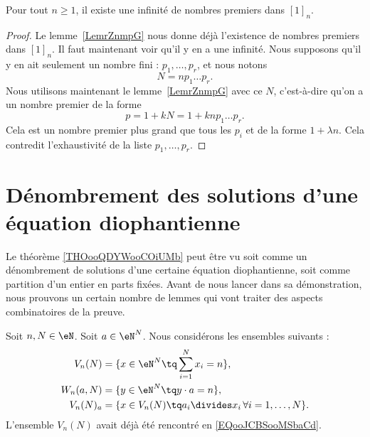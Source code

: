 \begin{theorem}    \label{ThoxwTjcl}
    Pour tout \( n\geq 1\), il existe une infinité de nombres premiers dans \( [1]_n\).
\end{theorem}

\begin{proof}
    Le lemme~\ref{LemrZnmpG} nous donne déjà l'existence de nombres premiers dans \( [1]_n\). Il faut maintenant voir qu'il y en a une infinité. Nous supposons qu'il y en ait seulement un nombre fini : \( p_1,\ldots, p_r\), et nous notons
    \begin{equation}
        N=np_1\ldots p_r.
    \end{equation}
    Nous utilisons maintenant le lemme~\ref{LemrZnmpG} avec ce \( N\), c'est-à-dire qu'on a un nombre premier de la forme
    \begin{equation}
        p=1+kN=1+knp_1\ldots p_r.
    \end{equation}
    Cela est un nombre premier plus grand que tous les \( p_i\) et de la forme \( 1+\lambda n\). Cela contredit l'exhaustivité de la liste \( p_1,\ldots, p_r\).
\end{proof}

\section{Dénombrement des solutions d'une équation diophantienne}

Le théorème \ref{THOooQDYWooCOiUMb} peut être vu soit comme un dénombrement de solutions d'une certaine équation diophantienne, soit comme partition d'un entier en parts fixées. Avant de nous lancer dans sa démonstration, nous prouvons un certain nombre de lemmes qui vont traiter des aspects combinatoires de la preuve.

Soit \( n,N\in \eN\). Soit \( a\in \eN^N\). Nous considérons les ensembles suivants :
\begin{subequations}
    \begin{align}
    V_n(N)&=\{ x\in \eN^N\tq \sum_{i=1}^Nx_i=n \}, \\
    W_n(a,N)&=\{ y\in \eN^N\tq y\cdot a=n \},\\
    V_n(N)_a&=\{ x\in V_n(N)\tq a_i\divides x_i\,\forall i=1,\ldots, N \}.
    \end{align}
\end{subequations}
L'ensemble \( V_n(N)\) avait déjà été rencontré en \eqref{EQooJCBSooMSbaCd}.

